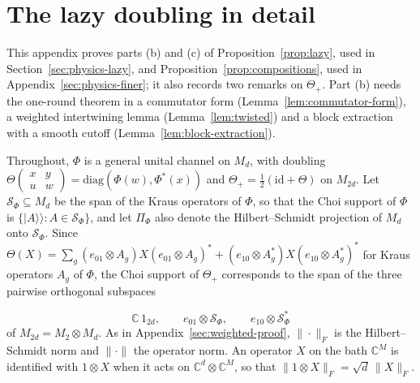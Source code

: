 \section{The lazy doubling in detail}\label{app:lazy}

This appendix proves parts (b) and (c) of Proposition~\ref{prop:lazy}, used in Section~\ref{sec:physics-lazy}, and
Proposition~\ref{prop:compositions}, used in Appendix~\ref{sec:physics-finer}; it also records two remarks on $\Theta_+$. Part (b) needs the
one-round theorem in a commutator form (Lemma~\ref{lem:commutator-form}), a weighted intertwining lemma (Lemma~\ref{lem:twisted}) and a block
extraction with a smooth cutoff (Lemma~\ref{lem:block-extraction}).

{\raggedright
Throughout, $\Phi$ is a general unital channel on $M_d$, with doubling
$\Theta(\begin{smallmatrix}x&y\\u&w\end{smallmatrix})=\mathrm{diag}(\Phi(w),\Phi^*(x))$ and $\Theta_+=\frac12(\mathrm{id}+\Theta)$ on $M_{2d}$. Let
$\mathcal S_\Phi\subseteq M_d$ be the span of the Kraus operators of $\Phi$, so that the Choi support of $\Phi$ is
$\{|A\rangle\!\rangle:A\in\mathcal S_\Phi\}$, and let $\Pi_\Phi$ also denote the Hilbert--Schmidt projection of $M_d$ onto $\mathcal S_\Phi$. Since
$\Theta(X)=\sum_g(e_{01}\otimes A_g)X(e_{01}\otimes A_g)^*+(e_{10}\otimes A_g^*)X(e_{10}\otimes A_g^*)^*$ for Kraus operators $A_g$ of $\Phi$, the Choi
support of $\Theta_+$ corresponds to the span of the three pairwise orthogonal subspaces\par}
\begin{equation}\label{eq:lazy-support}
\mathbb C\,1_{2d},\qquad e_{01}\otimes\mathcal S_\Phi,\qquad e_{10}\otimes\mathcal S_\Phi^*
\end{equation}
of $M_{2d}=M_2\otimes M_d$. As in Appendix~\ref{sec:weighted-proof}, $\|\cdot\|_F$ is the Hilbert--Schmidt norm and $\|\cdot\|$ the operator
norm. An operator $X$ on the bath $\mathbb C^M$ is identified with $1\otimes X$ when it acts on $\mathbb C^d\otimes\mathbb C^M$, so that
$\|1\otimes X\|_F=\sqrt d\,\|X\|_F$.

